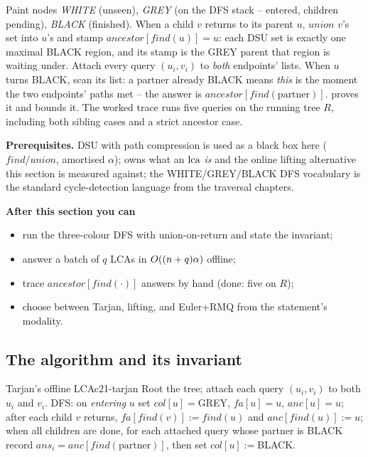 \begin{topicintro}
Paint nodes \emph{WHITE} (unseen), \emph{GREY} (on the DFS stack -- entered,
children pending), \emph{BLACK} (finished).  When a child \(v\) returns to its
parent \(u\), \(\mathit{union}\) \(v\)'s set into \(u\)'s and stamp
\(\mathit{ancestor}[\mathit{find}(u)] = u\): each DSU set is exactly one
maximal BLACK region, and its stamp is the GREY parent that region is waiting
under.  Attach every query \((u_i,v_i)\) to \emph{both} endpoints' lists.  When
\(u\) turns BLACK, scan its list: a partner already BLACK means \emph{this} is
the moment the two endpoints' paths met -- the answer is
\(\mathit{ancestor}[\mathit{find}(\text{partner})]\).   proves
it and bounds it.  The worked trace runs five queries on the running tree \(R\),
including both sibling cases and a strict ancestor case.

\textbf{Prerequisites.} DSU with path compression is used as a black box here
(\(\mathit{find}/\mathit{union}\), amortised \(\alpha\));  owns what
an \(\operatorname{lca}\) \emph{is} and the online lifting alternative this section is
measured against; the WHITE/GREY/BLACK DFS vocabulary is the standard
cycle-detection language from the traversal chapters.

\textbf{After this section you can}
\begin{itemize}[nosep]
  \item run the three-colour DFS with union-on-return and state the invariant; \hfill{}
  \item answer a batch of \(q\) LCAs in \(O((n+q)\alpha)\) offline; \hfill{}
  \item trace \(\mathit{ancestor}[\mathit{find}(\cdot)]\) answers by hand (done: five on \(R\)); \hfill{}
  \item choose between Tarjan, lifting, and Euler+RMQ from the statement's modality. \hfill{}
\end{itemize}
\end{topicintro}

\subsection{The algorithm and its invariant}

\begin{definition}{Tarjan's offline LCA}{c21-tarjan}
Root the tree; attach each query \((u_i,v_i)\) to both \(u_i\) and \(v_i\).
DFS: on \emph{entering} \(u\) set \(\mathit{col}[u]=\)GREY, \(\mathit{fa}[u]=u\),
\(\mathit{anc}[u]=u\); after each child \(v\) returns,
\(\mathit{fa}[\mathit{find}(v)] := \mathit{find}(u)\) and
\(\mathit{anc}[\mathit{find}(u)] := u\); when all children are done, for each
attached query whose partner is BLACK record
\(\mathit{ans}_i = \mathit{anc}[\mathit{find}(\text{partner})]\), then set
\(\mathit{col}[u]:=\)BLACK.
\end{definition}

